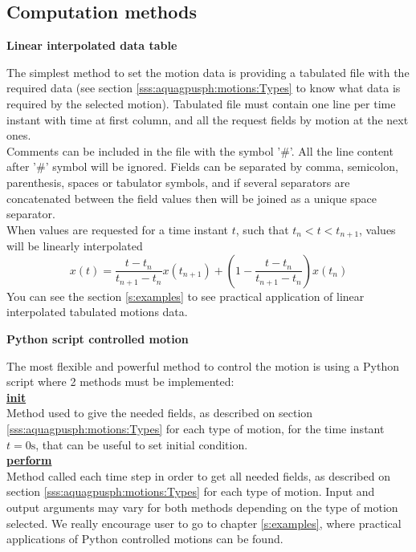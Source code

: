 \subsection{Computation methods}
\label{sss:aquagpusph:motions:Controls}
%
\begin{center}
\textbf{Linear interpolated data table}
\end{center}
%
The simplest method to set the motion data is providing a tabulated file with the required data (see section
\ref{sss:aquagpusph:motions:Types} to know what data is required by the selected motion). Tabulated file
must contain one line per time instant with time at first column, and all the request fields by motion at the next
ones.\\
%
Comments can be included in the file with the symbol '\#'. All the line content after '\#' symbol will be
ignored. Fields can be separated by comma, semicolon, parenthesis, spaces or tabulator symbols, and if several
separators are concatenated between the field values then will be joined as a unique space separator.\\
%
When values are requested for a time instant $t$, such that $t_n < t < t_{n+1}$, values will be linearly interpolated
%
\[x(t) = \frac{t - t_n}{t_{n+1}-t_n} x(t_{n+1}) + \left( 1 - \frac{t - t_n}{t_{n+1}-t_n} \right) x(t_n)\]
%
You can see the section \ref{s:examples} to see practical application of linear interpolated tabulated motions data.
%
\begin{center}
\textbf{Python script controlled motion}
\end{center}
%
The most flexible and powerful method to control the motion is using a Python script where 2 methods must be
implemented:\\
%
\underline{\textbf{init}}\\
%
Method used to give the needed fields, as described on section \ref{sss:aquagpusph:motions:Types} for each type of
motion, for the time instant $t = 0 \mathrm{s}$, that can be useful to set initial condition.\\
%
\underline{\textbf{perform}}\\
%
Method called each time step in order to get all needed fields, as described on section
\ref{sss:aquagpusph:motions:Types} for each type of motion.
%
Input and output arguments may vary for both methods depending on the type of motion selected. We really encourage
user to go to chapter \ref{s:examples}, where practical applications of Python controlled motions can be found.
%